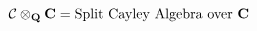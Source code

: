 \begin{equation}
{\cal C}\otimes_{\bf Q}{\bf C}= \hbox{Split Cayley Algebra over} {\bf ~C}
\end{equation}

